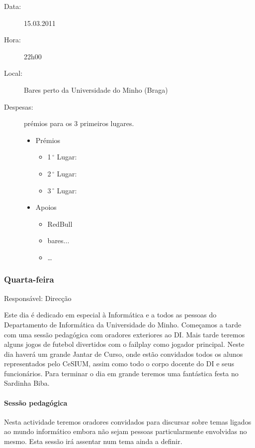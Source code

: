 \begin{description}
	\item[Data:] 15.03.2011
	\item[Hora:] 22h00
	\item[Local:] Bares perto da Universidade do Minho (Braga)
	\item[Despesas:] prémios para os 3 primeiros lugares.
	\begin{itemize}
		\item Prémios
		\begin{itemize}
			\item 1$\,^{\circ}$ Lugar:
			\item 2$\,^{\circ}$ Lugar:
			\item 3$\,^{\circ}$ Lugar:
		\end{itemize}
		\item Apoios
		\begin{itemize}
			\item RedBull
			\item bares...
			\item \dots  
		\end{itemize}
	\end{itemize}
\end{description}



\subsubsection*{Quarta-feira}
Responsável: Direcção

Este dia é dedicado em especial à Informática e a todos as pessoas do Departamento de Informática da Universidade do Minho.
Começamos a tarde com uma sessão pedagógica com oradores exteriores ao DI. Mais tarde teremos alguns jogos de futebol divertidos com o failplay como jogador principal. Neste dia haverá um grande Jantar de Curso, onde estão convidados todos os alunos representados pelo CeSIUM, assim como todo o corpo docente do DI e seus funcionários. Para terminar o dia em grande teremos uma fantástica festa no Sardinha Biba.

\paragraph{Sessão pedagógica}
Nesta actividade teremos oradores convidados para discursar sobre temas ligados ao mundo informático embora não sejam pessoas particularmente envolvidas no mesmo. Esta sessão irá assentar num tema ainda a definir.

